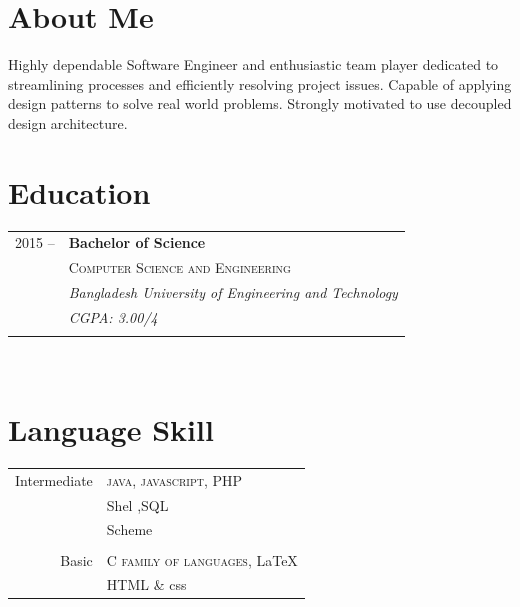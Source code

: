 \documentclass[10pt]{article} %
\begin{document}
{\begin{minipage}[t]{0.44\textwidth}
\section{About Me}
\normalsize{Highly dependable Software Engineer and enthusiastic team player dedicated to streamlining processes and efficiently resolving project issues. Capable of applying design patterns to solve real world problems. Strongly motivated to use decoupled design architecture.}\\

\section{Education} 

\begin{tabular}{rl} %


2015 --  & \textbf{Bachelor of Science} \\ 
& \textsc{Computer Science and Engineering} \\ 
& \textit{Bangladesh University of Engineering and Technology}\\
& \textit{CGPA: 3.00/4}\\
&\\
	 


\end{tabular}\\[10pt]


\section{Language Skill} 

\begin{tabular}{rl}
Intermediate 
& \textsc{java}, \textsc{javascript}, PHP\\
& Shel ,SQL\\
& Scheme \\
&\\
Basic 
& \textsc{C family of languages}, \LaTeX\\ 
&HTML \& css\\
\end{tabular}


\end{minipage}}
\end{document}
